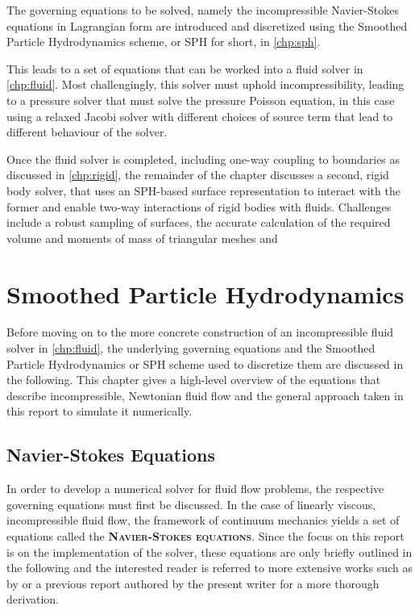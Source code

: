 \documentclass[oneside, a4paper]{book}
\newcommand\emphasis[1]{{\scshape\bfseries#1}}
\begin{document}
The governing equations to be solved, namely the incompressible Navier-Stokes equations in Lagrangian form are introduced and discretized using the Smoothed Particle Hydrodynamics scheme, or SPH for short, in \autoref{chp:sph}. 

This leads to a set of equations that can be worked into a fluid solver in \autoref{chp:fluid}. Most challengingly, this solver must uphold incompressibility, leading to a pressure solver that must solve the pressure Poisson equation, in this case using a relaxed Jacobi solver with different choices of source term that lead to different behaviour of the solver. 

Once the fluid solver is completed, including one-way coupling to boundaries as discussed in \autoref{chp:rigid}, the remainder of the chapter discusses a second, rigid body solver, that uses an SPH-based surface representation to interact with the former and enable two-way interactions of rigid bodies with fluids. Challenges include a robust sampling of surfaces, the accurate calculation of the required volume and moments of mass of triangular meshes and 


\chapter{Smoothed Particle Hydrodynamics}\label{chp:sph}
    Before moving on to the more concrete construction of an incompressible fluid solver in \autoref{chp:fluid}, the underlying governing equations and the Smoothed Particle Hydrodynamics or SPH scheme used to discretize them are discussed in the following. This chapter gives a high-level overview of the equations that describe incompressible, Newtonian fluid flow and the general approach taken in this report to simulate it numerically.

    \section{Navier-Stokes Equations}\label{sec:navier-stokes}
    In order to develop a numerical solver for fluid flow problems, the respective governing equations must first be discussed. In the case of linearly viscous, incompressible fluid flow, the framework of continuum mechanics yields a set of equations called the \emphasis{Navier-Stokes equations}. Since the focus on this report is on the implementation of the solver, these equations are only briefly outlined in the following and the interested reader is referred to more extensive works such as by \cite[Anderson]{anderson} or a previous report authored by the present writer \autocite{labcourse} for a more thorough derivation.
\end{document}

